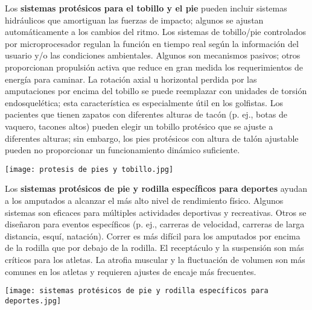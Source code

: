 \documentclass{article}
\begin{document}
Los \textbf {sistemas protésicos para el tobillo y el pie} pueden incluir sistemas hidráulicos que amortiguan las fuerzas de impacto; algunos se ajustan automáticamente a los cambios del ritmo. Los sistemas de tobillo/pie controlados por microprocesador regulan la función en tiempo real según la información del usuario y/o las condiciones ambientales. Algunos son mecanismos pasivos; otros proporcionan propulsión activa que reduce en gran medida los requerimientos de energía para caminar. La rotación axial u horizontal perdida por las amputaciones por encima del tobillo se puede reemplazar con unidades de torsión endosquelética; esta característica es especialmente útil en los golfistas. Los pacientes que tienen zapatos con diferentes alturas de tacón (p. ej., botas de vaquero, tacones altos) pueden elegir un tobillo protésico que se ajuste a diferentes alturas; sin embargo, los pies protésicos con altura de talón ajustable pueden no proporcionar un funcionamiento dinámico suficiente.

\hspace{1cm} 

\begin{minipage}{.89\linewidth}
\centering
\texttt{[image: protesis de pies y tobillo.jpg]}
\end{minipage}


\hspace{3cm}

Los \textbf {sistemas protésicos de pie y rodilla específicos para deportes} ayudan a los amputados a alcanzar el más alto nivel de rendimiento físico. Algunos sistemas son eficaces para múltiples actividades deportivas y recreativas. Otros se diseñaron para eventos específicos (p. ej., carreras de velocidad, carreras de larga distancia, esquí, natación). Correr es más difícil para los amputados por encima de la rodilla que por debajo de la rodilla. El receptáculo y la suspensión son más críticos para los atletas. La atrofia muscular y la fluctuación de volumen son más comunes en los atletas y requieren ajustes de encaje más frecuentes.

\hspace{1cm} 

\begin{minipage}{.89\linewidth}
\centering
\texttt{[image: sistemas protésicos de pie y rodilla específicos para deportes.jpg]}
\end{minipage}


\hspace{1cm}
\end{document}
